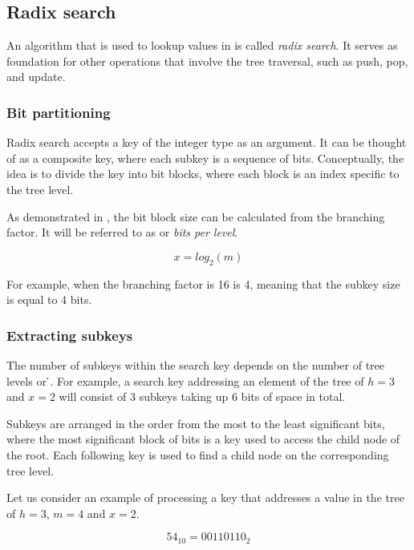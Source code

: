 \subsection{Radix search}
\label{sec:rb-tree-radix-search}

An algorithm that is used to lookup values in \treerb{} is called \emph{radix search}. It serves as foundation for other operations that involve the tree traversal, such as push, pop, and update.

\subsubsection*{Bit partitioning}
Radix search accepts a key of the integer type as an argument. It can be thought of as a composite key, where each subkey is a sequence of bits. Conceptually, the idea is to divide the key into bit blocks, where each block is an index specific to the tree level.

As demonstrated in , the bit block size can be calculated from the branching factor. It will be referred to as \x{} or \emph{bits per level}.

\begin{equation}
    \label{eq:bits-per-level}
    x = log_2(m)
\end{equation}

For example, when the branching factor \m{} is 16 \x{} is 4, meaning that the subkey size is equal to 4 bits.

\subsubsection*{Extracting subkeys}
The number of subkeys within the search key depends on the number of tree levels or \h{}. For example, a search key addressing an element of the tree of ${h = 3}$ and ${x = 2}$ will consist of 3 subkeys taking up 6 bits of space in total.

Subkeys are arranged in the order from the most to the least significant bits, where the most significant block of bits is a key used to access the child node of the root. Each following key is used to find a child node on the corresponding tree level.

Let us consider an example of processing a key that addresses a value in the tree of $h = 3$, $m = 4$ and $x = 2$.

\begin{equation}
    54_{10} = 00110110_2
\end{equation}

